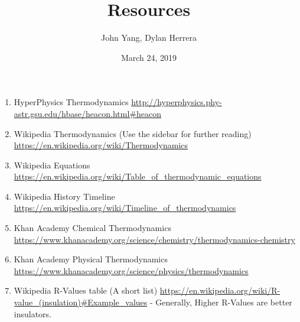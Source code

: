 \documentclass{article}
\title{Resources}
\author{John Yang, Dylan Herrera}
\date{March 24, 2019}
\begin{document}
\maketitle
\begin{enumerate}
\item HyperPhysics Thermodynamics \url{http://hyperphysics.phy-astr.gsu.edu/hbase/heacon.html\#heacon}
\item Wikipedia Thermodynamics (Use the sidebar for further reading) \url{https://en.wikipedia.org/wiki/Thermodynamics}
\item Wikipedia Equations \url{https://en.wikipedia.org/wiki/Table_of_thermodynamic_equations}
\item Wikipedia History Timeline \url{https://en.wikipedia.org/wiki/Timeline_of_thermodynamics}
\item Khan Academy Chemical Thermodynamics \url{https://www.khanacademy.org/science/chemistry/thermodynamics-chemistry}
\item Khan Academy Physical Thermodynamics \url{https://www.khanacademy.org/science/physics/thermodynamics}
\item Wikipedia R-Values table (A short list) \url{https://en.wikipedia.org/wiki/R-value_(insulation)\#Example\_values} - Generally, Higher R-Values are better insulators. 
\end{enumerate}
\end{document}
